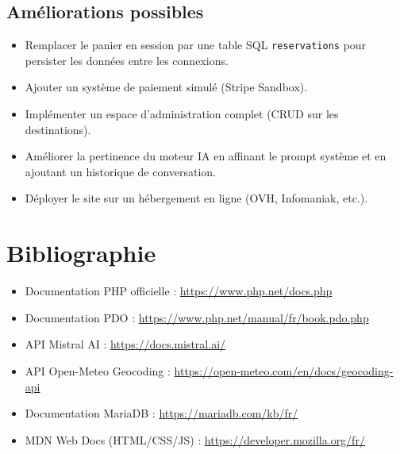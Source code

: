 \documentclass[a4paper,12pt]{article}
\begin{document}
\subsection{Améliorations possibles}

\begin{itemize}
  \item Remplacer le panier en session par une table SQL \texttt{reservations} pour persister les données entre les connexions.
  \item Ajouter un système de paiement simulé (Stripe Sandbox).
  \item Implémenter un espace d'administration complet (CRUD sur les destinations).
  \item Améliorer la pertinence du moteur IA en affinant le prompt système et en ajoutant un historique de conversation.
  \item Déployer le site sur un hébergement en ligne (OVH, Infomaniak, etc.).
\end{itemize}

\section{Bibliographie}

\begin{itemize}
  \item Documentation PHP officielle : \url{https://www.php.net/docs.php}
  \item Documentation PDO : \url{https://www.php.net/manual/fr/book.pdo.php}
  \item API Mistral AI : \url{https://docs.mistral.ai/}
  \item API Open-Meteo Geocoding : \url{https://open-meteo.com/en/docs/geocoding-api}
  \item Documentation MariaDB : \url{https://mariadb.com/kb/fr/}
  \item MDN Web Docs (HTML/CSS/JS) : \url{https://developer.mozilla.org/fr/}
\end{itemize}
\end{document}
